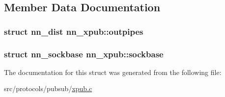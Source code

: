 \subsection{Member Data Documentation}
\subsubsection[{outpipes}]{\setlength{\rightskip}{0pt plus 5cm}struct {\bf nn\+\_\+dist} nn\+\_\+xpub\+::outpipes}\hypertarget{structnn__xpub_a924e28cc57e4c4d0b08f22c4958f70cf}{}\label{structnn__xpub_a924e28cc57e4c4d0b08f22c4958f70cf}
\subsubsection[{sockbase}]{\setlength{\rightskip}{0pt plus 5cm}struct {\bf nn\+\_\+sockbase} nn\+\_\+xpub\+::sockbase}\hypertarget{structnn__xpub_adf60875a20e0267e62049b1e2247dd84}{}\label{structnn__xpub_adf60875a20e0267e62049b1e2247dd84}


The documentation for this struct was generated from the following file\+:\begin{DoxyCompactItemize}
\item 
src/protocols/pubsub/\hyperlink{xpub_8c}{xpub.\+c}\end{DoxyCompactItemize}
